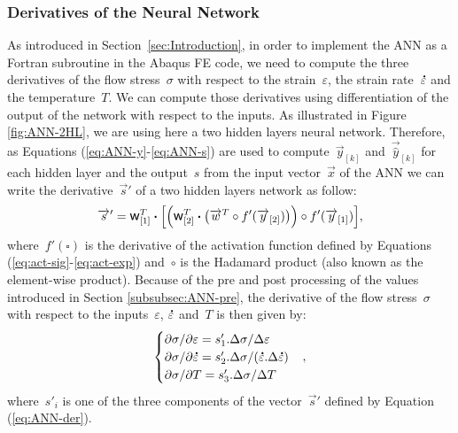 \documentclass[algorithms,article,submit,pdftex,oneauthors]{Definitions/mdpi}
\DeclareRobustCommand{\w}{\mbox{\large\ensuremath{\mathsf{w}}}}
\DeclareRobustCommand{\dotp}{\boldsymbol{\cdot}}
\DeclareRobustCommand{\lay}[1]{_{[#1]}}
\DeclareRobustCommand{\mdot}[1]{\accentset{\mbox{\bfseries .}}{#1}}
\begin{document}
\subsubsection{Derivatives of the Neural Network}\label{subsubsec:ANN-der}

As introduced in Section~\ref{sec:Introduction}, in order to implement the ANN as a Fortran subroutine in the Abaqus FE code, we need to compute the three derivatives of the flow stress~$\sigma$ with respect to the strain~$\varepsilon$, the strain rate~$\mdot{\varepsilon}$ and the temperature~$T$.
We can compute those derivatives using differentiation of the output of the network with respect to the inputs.
As illustrated in Figure \ref{fig:ANN-2HL}, we are using here a two hidden layers neural network.
Therefore, as Equations (\ref{eq:ANN-y}-\ref{eq:ANN-s}) are used to compute~$\overrightarrow{y}\lay{k}$ and~$\overrightarrow{\hat{y}}\lay{k}$ for each hidden layer and the output~$s$ from the input vector~$\overrightarrow{x}$ of the ANN we can write the derivative~$\overrightarrow{s}'$ of a two hidden layers network as follow:
\begin{equation}
\overrightarrow{s}' = \w\lay{1}^T \dotp\left[\left(\w\lay{2}^T \dotp \left(\overrightarrow{w}^T \circ f'(\overrightarrow{y}\lay{2})\right)\right) \circ f'(\overrightarrow{y}\lay{1})\right] \label{eq:ANN-der},
\end{equation}
where~$f'\left(\square\right)$ is the derivative of the activation function defined by Equations (\ref{eq:act-sig}-\ref{eq:act-exp}) and~$\circ$ is the Hadamard product (also known as the element-wise product).
Because of the pre and post processing of the values introduced in Section \ref{subsubsec:ANN-pre}, the derivative of the flow stress~$\sigma$ with respect to the inputs~$\varepsilon$, $\mdot{\varepsilon}$ and~$T$ is then given by:
\begin{equation}
\begin{cases}
\partial \sigma/\partial \varepsilon = s'_1.\Delta\sigma / \Delta\varepsilon\\
\partial \sigma/\partial\mdot{\varepsilon} = s'_2.\Delta\sigma / (\mdot{\varepsilon}.\Delta\mdot{\varepsilon})\\
\partial \sigma/\partial T = s'_3.\Delta\sigma / \Delta T
\end{cases}
\label{eq:ANN-der2},
\end{equation}
where~$s'_i$ is one of the three components of the vector~$\overrightarrow{s}'$ defined by Equation (\ref{eq:ANN-der}).
\end{document}
